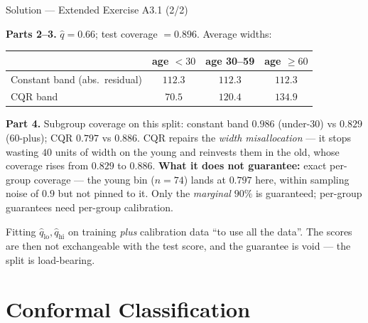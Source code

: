 \documentclass[aspectratio=169,11pt]{beamer}
\begin{document}
\begin{frame}{Solution --- Extended Exercise A3.1 (2/2)}
\begin{solutionbox}
  \scriptsize
  \textbf{Parts 2--3.} $\hat q = 0.66$; test coverage $= 0.896$. Average widths:
  \begin{center}
  \begin{tabular}{@{}lccc@{}}
    \toprule
    & age $<30$ & age 30--59 & age $\ge 60$ \\
    \midrule
    Constant band (abs.\ residual) & $112.3$ & $112.3$ & $112.3$ \\
    CQR band & $70.5$ & $120.4$ & $134.9$ \\
    \bottomrule
  \end{tabular}
  \end{center}
  \textbf{Part 4.} Subgroup coverage on this split: constant band $0.986$ (under-30)
  vs $0.829$ (60-plus); CQR $0.797$ vs $0.886$. CQR repairs the \emph{width
  misallocation} --- it stops wasting $40$ units of width on the young and reinvests
  them in the old, whose coverage rises from $0.829$ to $0.886$.
  \textbf{What it does not guarantee:} exact per-group coverage --- the young bin
  ($n = 74$) lands at $0.797$ here, within sampling noise of $0.9$ but not pinned to
  it. Only the \emph{marginal} $90\%$ is guaranteed; per-group guarantees need
  per-group calibration.
\end{solutionbox}
\begin{mistake}
  Fitting $\hat q_{\text{lo}}, \hat q_{\text{hi}}$ on training \emph{plus} calibration
  data ``to use all the data''. The scores are then not exchangeable with the test
  score, and the guarantee is void --- the split is load-bearing.
\end{mistake}
\end{frame}

\section[Classification]{Conformal Classification}
\end{document}
